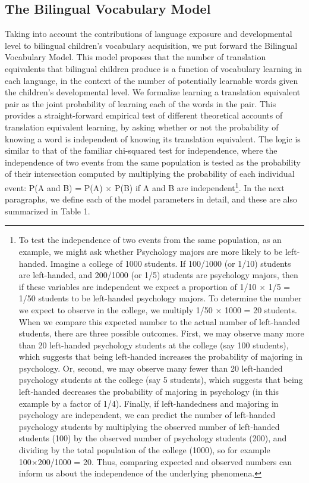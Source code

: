 \documentclass[
  english,
  ,man,floatsintext]{apa6}
\begin{document}
\hypertarget{the-bilingual-vocabulary-model}{%
\subsection{The Bilingual Vocabulary Model}\label{the-bilingual-vocabulary-model}}

Taking into account the contributions of language exposure and developmental level to bilingual children's vocabulary acquisition, we put forward the Bilingual Vocabulary Model. This model proposes that the number of translation equivalents that bilingual children produce is a function of vocabulary learning in each language, in the context of the number of potentially learnable words given the children's developmental level. We formalize learning a translation equivalent pair as the joint probability of learning each of the words in the pair. This provides a straight-forward empirical test of different theoretical accounts of translation equivalent learning, by asking whether or not the probability of knowing a word is independent of knowing its translation equivalent. The logic is similar to that of the familiar chi-squared test for independence, where the independence of two events from the same population is tested as the probability of their intersection computed by multiplying the probability of each individual event: P(A and B) = P(A) × P(B) if A and B are independent\footnote{To test the independence of two events from the same population, as an example, we might ask whether Psychology majors are more likely to be left-handed. Imagine a college of 1000 students. If 100/1000 (or 1/10) students are left-handed, and 200/1000 (or 1/5) students are psychology majors, then if these variables are independent we expect a proportion of 1/10 × 1/5 = 1/50 students to be left-handed psychology majors. To determine the number we expect to observe in the college, we multiply 1/50 × 1000 = 20 students. When we compare this expected number to the actual number of left-handed students, there are three possible outcomes. First, we may observe many more than 20 left-handed psychology students at the college (say 100 students), which suggests that being left-handed increases the probability of majoring in psychology. Or, second, we may observe many fewer than 20 left-handed psychology students at the college (say 5 students), which suggests that being left-handed decreases the probability of majoring in psychology (in this example by a factor of 1/4). Finally, if left-handedness and majoring in psychology are independent, we can predict the number of left-handed psychology students by multiplying the observed number of left-handed students (100) by the observed number of psychology students (200), and dividing by the total population of the college (1000), so for example 100×200/1000 = 20. Thus, comparing expected and observed numbers can inform us about the independence of the underlying phenomena.}. In the next paragraphs, we define each of the model parameters in detail, and these are also summarized in Table 1.
\end{document}
